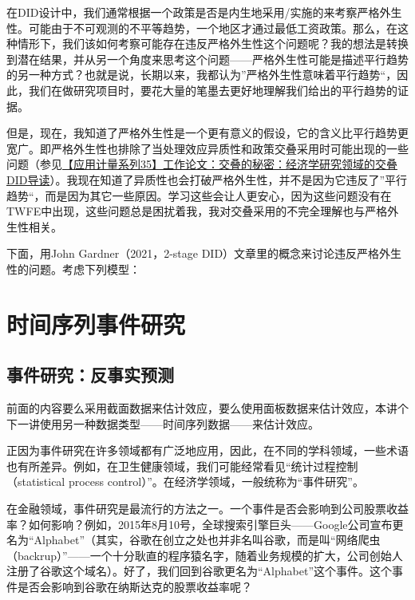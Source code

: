 \documentclass[cn,12pt,math=newtx,citestyle=gb7714-2015,bibstyle=gb7714-2015]{elegantbook}
\begin{document}
	    在DID设计中，我们通常根据一个政策是否是内生地采用/实施的来考察严格外生性。可能由于不可观测的不平等趋势，一个地区才通过最低工资政策。那么，在这种情形下，我们该如何考察可能存在违反严格外生性这个问题呢？我的想法是转换到潜在结果，并从另一个角度来思考这个问题——严格外生性可能是描述平行趋势的另一种方式？也就是说，长期以来，我都认为”严格外生性意味着平行趋势“，因此，我们在做研究项目时，要花大量的笔墨去更好地理解我们给出的平行趋势的证据。
	    
	    但是，现在，我知道了严格外生性是一个更有意义的假设，它的含义比平行趋势更宽广。即严格外生性也排除了当处理效应异质性和政策交叠采用时可能出现的一些问题（参见\href{https://mp.weixin.qq.com/s?__biz=MzAwODY5MDA3NA==&mid=2455734924&idx=1&sn=5990e3522a6a5288134d9205c1fe163b&chksm=8cc02a79bbb7a36f2f86680b85f4fb336c7469e7b187e2c1f8bb9165729a7097164488e729a5&scene=21#wechat_redirect}{【应用计量系列35】工作论文：交叠的秘密：经济学研究领域的交叠DID导读}）。我现在知道了异质性也会打破严格外生性，并不是因为它违反了”平行趋势“，而是因为其它一些原因。学习这些会让人更安心，因为这些问题没有在TWFE中出现，这些问题总是困扰着我，我对交叠采用的不完全理解也与严格外生性相关。
	    
	    下面，用John Gardner（2021，2-stage  DID）文章里的概念来讨论违反严格外生性的问题。考虑下列模型：
	    
	    
	   
	
	
	\section{时间序列事件研究}
	
		\subsection{事件研究：反事实预测}
	
	前面的内容要么采用截面数据来估计效应，要么使用面板数据来估计效应，本讲个下一讲使用另一种数据类型——时间序列数据——来估计效应。
	
	正因为事件研究在许多领域都有广泛地应用，因此，在不同的学科领域，一些术语也有所差异。例如，在卫生健康领域，我们可能经常看见“统计过程控制（statistical process control）”。在经济学领域，一般统称为“事件研究”。
	
	在金融领域，事件研究是最流行的方法之一。一个事件是否会影响到公司股票收益率？如何影响？例如，2015年8月10号，全球搜索引擎巨头——Google公司宣布更名为“Alphabet”（其实，谷歌在创立之处也并非名叫谷歌，而是叫“网络爬虫（backrup）”——一个十分耿直的程序猿名字，随着业务规模的扩大，公司创始人注册了谷歌这个域名）。好了，我们回到谷歌更名为“Alphabet”这个事件。这个事件是否会影响到谷歌在纳斯达克的股票收益率呢？
	
\end{document}
